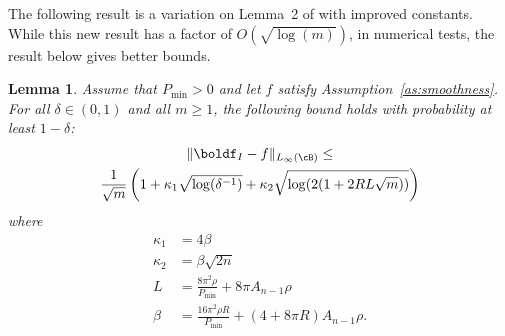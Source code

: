 \documentclass[letterpaper, 10 pt, conference]{ieeeconf}  %
\newtheorem{lemma}{Lemma}
\begin{document}
The following result is a variation on Lemma~2 of \cite{lamperski2024approximation} with improved constants. While this new result has a factor of $O(\sqrt{\log(m)})$, in numerical tests, the result below gives better bounds. 

\begin{lemma}
  \label{lem:importance}
  {\it
    Assume that $P_{\min}>0$ and let $f$ satisfy Assumption~\ref{as:smoothness}. 
    For all $\delta \in (0,1)$ and all $m\ge 1$, the following bound holds with probability at least $1-\delta$:
    \begin{multline*}
      \|\boldf_I-f\|_{L_{\infty}(\cB)}\le
      \\ \frac{1}{\sqrt{m}}\left(1+\kappa_1\sqrt{\log(\delta^{-1})}+\kappa_2
                                        \sqrt{\log(2(1+2RL\sqrt{m}))}
                                        \right)
    \end{multline*}
    where
    \begin{align*}
      \kappa_1&=4\beta\\
      \kappa_2&=\beta\sqrt{2n}\\
      L&=\frac{8\pi^2 \rho}{P_{\min}}+8\pi A_{n-1} \rho\\
      \beta&= \frac{16\pi^2 \rho R}{P_{\min}}+(4+8\pi R)A_{n-1}\rho.
    \end{align*}
  }
\end{lemma}
\end{document}
